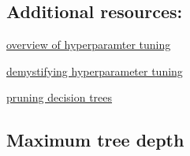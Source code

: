 \documentclass[11pt]{article}
\begin{document}
    \hypertarget{additional-resources}{%
\subsection{Additional resources:}\label{additional-resources}}

\href{https://cloud.google.com/ai-platform/training/docs/hyperparameter-tuning-overview}{overview
of hyperparamter tuning}

\href{https://towardsdatascience.com/demystifying-hyper-parameter-tuning-acb83af0258f}{demystifying
hyperparameter tuning}

\href{https://www.displayr.com/machine-learning-pruning-decision-trees/}{pruning
decision trees}

    \hypertarget{maximum-tree-depth}{%
\subsection{Maximum tree depth}\label{maximum-tree-depth}}
\end{document}
